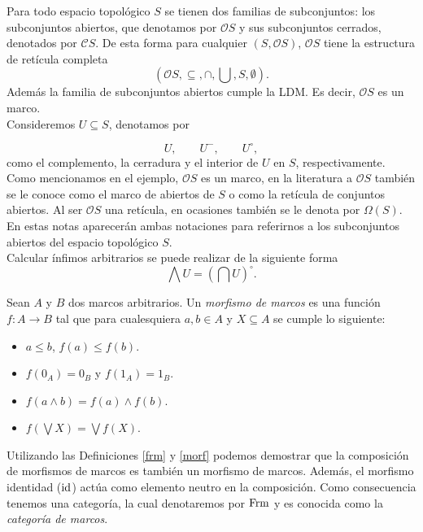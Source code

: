 \begin{ej}\label{ejem1}
Para todo espacio topológico $S$ se tienen dos familias de subconjuntos: los subconjuntos abiertos, que denotamos por $\mathcal{O}S$ y sus subconjuntos cerrados, denotados por $\mathcal{C}S$. De esta forma para cualquier $(S,\mathcal{O}S)$, $\mathcal{O}S$ tiene la estructura  de retícula completa $$(\mathcal{O}S, \subseteq, \cap,\bigcup, S,\emptyset).$$
Además la familia de subconjuntos abiertos cumple la LDM. Es decir, $\mathcal{O}S$ es un marco.\\

Consideremos $U\subseteq S$, denotamos por

\[
U,\qquad U^-,\qquad U^\circ,
\]
como el complemento, la cerradura y el interior de $U$ en $S$, respectivamente.\\ 

Como mencionamos en el ejemplo, $\mathcal{O}S$ es un marco, en la literatura a $\mathcal{O}S$ también se le conoce como el marco de abiertos de $S$ o como la retícula de conjuntos abiertos. Al ser $\mathcal{O}S$ una retícula, en ocasiones también se le denota por $\Omega(S)$. En estas notas aparecerán ambas notaciones para referirnos a los subconjuntos abiertos del espacio topológico $S$.\\

Calcular ínfimos arbitrarios se puede realizar de la siguiente forma 
\[
\bigwedge U=\left(\bigcap U\right)^\circ.
\]
\end{ej}

\begin{dfn}\label{morf}
Sean $A$ y $B$ dos marcos arbitrarios. Un \emph{morfismo de marcos} es una función $f\colon A\rightarrow B$ tal que para cualesquiera $a,b\in A$ y $X\subseteq A$ se cumple lo siguiente:
\begin{itemize}
\item $a\leq b$, $f(a)\leq f(b)$.
\item $f(0_A)=0_B$ y $f(1_A)=1_B$.
\item $f(a\wedge b)= f(a)\wedge f(b)$.
\item $f(\bigvee X)=\bigvee f(X)$.
\end{itemize}
\end{dfn}

Utilizando las Definiciones \ref{frm} y \ref{morf} podemos demostrar que la composición de morfismos de marcos es también un morfismo de marcos. Además, el morfismo identidad ($\mathrm{id}$) actúa como elemento neutro en la composición. Como consecuencia tenemos una categoría, la cual denotaremos por $\mathrm{Frm}$ y es conocida como la \emph{categoría de marcos}.

